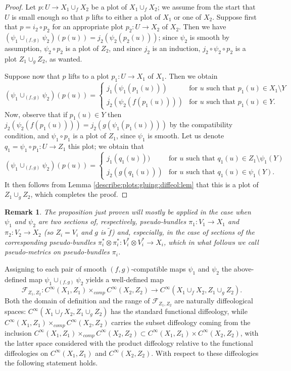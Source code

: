 \documentclass{article}
\newtheorem{rem}[lemma]{Remark}
\begin{document}
\begin{proof}
Let $p:U\to X_1\cup_f X_2$ be a plot of $X_1\cup_f X_2$; we assume from the start that $U$ is small enough so that $p$ lifts to either a plot of $X_1$ or one of $X_2$. Suppose first that $p=i_2\circ p_2$
for an appropriate plot $p_2:U\to X_2$ of $X_2$. Then we have $(\psi_1\cup_{(f,g)}\psi_2)(p(u))=j_2(\psi_2(p_2(u)))$; since $\psi_2$ is smooth by assumption, $\psi_2\circ p_2$ is a plot of $Z_2$, and 
since $j_2$ is an induction, $j_2\circ\psi_2\circ p_2$ is a plot $Z_1\cup_g Z_2$, as wanted.

Suppose now that $p$ lifts to a plot $p_1:U\to X_1$ of $X_1$. Then we obtain
$$(\psi_1\cup_{(f,g)}\psi_2)(p(u))=\left\{\begin{array}{ll} j_1(\psi_1(p_1(u))) & \mbox{for }u\mbox{ such that }p_1(u)\in X_1\setminus Y\\
j_2(\psi_2(f(p_1(u)))) & \mbox{for }u\mbox{ such that }p_1(u)\in Y.\end{array}\right.$$ Now, observe that if $p_1(u)\in Y$ then $j_2(\psi_2(f(p_1(u))))=j_2(g(\psi_1(p_1(u))))$ by the compatibility condition, 
and $\psi_1\circ p_1$ is a plot of $Z_1$, since $\psi_1$ is smooth. Let us denote $q_1=\psi_1\circ p_1:U\to Z_1$ this plot; we obtain that
$$(\psi_1\cup_{(f,g)}\psi_2)(p(u))=\left\{\begin{array}{ll} j_1(q_1(u))) & \mbox{for }u\mbox{ such that }q_1(u)\in Z_1\setminus\psi_1(Y)\\
j_2(g(q_1(u))) & \mbox{for }u\mbox{ such that }q_1(u)\in\psi_1(Y).\end{array}\right.$$ It then follows from Lemma \ref{describe:plots:gluing:diffeol:lem} that this is a plot of $Z_1\cup_g Z_2$, which completes 
the proof.
\end{proof}

\begin{rem}
The proposition just proven will mostly be applied in the case when $\psi_1$ and $\psi_2$ are two sections of, respectively, pseudo-bundles $\pi_1:V_1\to X_1$ and $\pi_2:V_2\to X_2$ (so $Z_i=V_i$ and 
$g$ is $\tilde{f}$) and, especially, in the case of sections of the corresponding pseudo-bundles $\pi_i^*\otimes\pi_i^*:V_i^*\otimes V_i^*\to X_i$, which in what follows we call \emph{pseudo-metrics} on 
pseudo-bundles $\pi_i$. 
\end{rem}

Assigning to each pair of smooth $(f,g)$-compatible maps $\psi_1$ and $\psi_2$ the above-defined map $\psi_1\cup_{(f,g)}\psi_2$ yields a well-defined map
$$\mathcal{F}_{Z_1,Z_2}:C^{\infty}(X_1,Z_1)\times_{comp}C^{\infty}(X_2,Z_2)\to C^{\infty}(X_1\cup_f X_2,Z_1\cup_g Z_2).$$ Both the domain of definition and the range of $\mathcal{F}_{Z_1,Z_2}$ are 
naturally diffeological spaces: $C^{\infty}(X_1\cup_f X_2,Z_1\cup_g Z_2)$ has the standard functional diffeology, while $C^{\infty}(X_1,Z_1)\times_{comp}C^{\infty}(X_2,Z_2)$ carries the subset diffeology 
coming from the inclusion $C^{\infty}(X_1,Z_1)\times_{comp}C^{\infty}(X_2,Z_2)\subset C^{\infty}(X_1,Z_1)\times C^{\infty}(X_2,Z_2)$, with the latter space considered with the product diffeology relative to 
the functional diffeologies on $C^{\infty}(X_1,Z_1)$ and $C^{\infty}(X_2,Z_2)$. With respect to these diffeologies the following statement holds.
\end{document}

